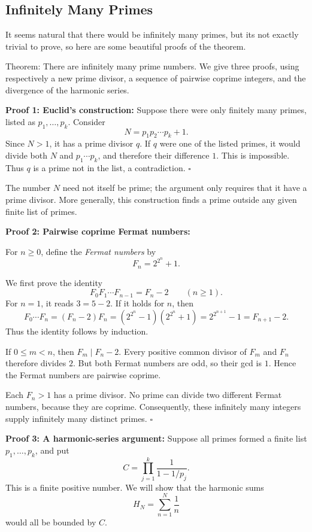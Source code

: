 \documentclass[a4paper,11pt,abstracton]{scrartcl}
\theoremstyle{dotlessP}
\theoremstyle{dotlessS}
\theoremstyle{remark}
\theoremstyle{definition}
\begin{document}
\subsection{Infinitely Many Primes}

It seems natural that there would be infinitely many primes, but its not exactly trivial to prove, so here are some beautiful proofs of the theorem.

\begin{mainbox}{Theorem:}
There are infinitely many prime numbers. We give three proofs, using
respectively a new prime divisor, a sequence of pairwise coprime
integers, and the divergence of the harmonic series.
\end{mainbox}

\textbf{Proof 1: Euclid's construction:}
Suppose there were only finitely many primes, listed as
$p_1,\ldots,p_k$. Consider
\[
    N=p_1p_2\cdots p_k+1.
\]
Since $N>1$, it has a prime divisor $q$. If $q$ were one of the listed
primes, it would divide both $N$ and $p_1\cdots p_k$, and therefore
their difference $1$. This is impossible. Thus $q$ is a prime not
in the list, a contradiction.
\hfill$\square$


The number $N$ need not itself be prime; the argument only requires
that it have a prime divisor. More generally, this construction finds
a prime outside any given finite list of primes.

\textbf{Proof 2: Pairwise coprime Fermat numbers:}
\begin{definition_box}
For $n\geq0$, define the \emph{Fermat numbers} by
\[
    F_n=2^{2^n}+1.
\]
\end{definition_box}

We first prove the identity
\[
    F_0F_1\cdots F_{n-1}=F_n-2\qquad(n\geq1).
\]
For $n=1$, it reads $3=5-2$. If it holds for $n$, then
\[
    F_0\cdots F_n=(F_n-2)F_n
    =(2^{2^n}-1)(2^{2^n}+1)
    =2^{2^{n+1}}-1=F_{n+1}-2.
\]
Thus the identity follows by induction.

If $0\leq m<n$, then $F_m\mid F_n-2$. Every positive common divisor
of $F_m$ and $F_n$ therefore divides $2$. But both Fermat numbers
are odd, so their gcd is $1$. Hence the Fermat numbers are pairwise
coprime.

Each $F_n>1$ has a prime divisor. No prime can divide two different
Fermat numbers, because they are coprime. Consequently, these infinitely
many integers supply infinitely many distinct primes.
\hfill$\square$

\textbf{Proof 3: A harmonic-series argument:}
Suppose all primes formed a finite list $p_1,\ldots,p_k$, and put
\[
    C=\prod_{j=1}^{k}\frac{1}{1-1/p_j}.
\]
This is a finite positive number. We will show that the harmonic sums
\[
    H_N=\sum_{n=1}^{N}\frac{1}{n}
\]
would all be bounded by $C$.
\end{document}
